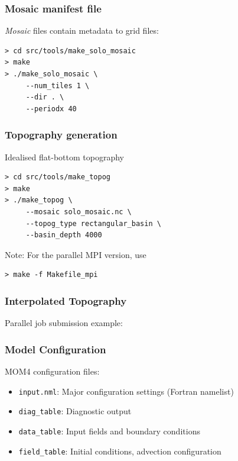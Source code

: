\documentclass[red]{beamer}
\begin{document}
\begin{frame}[fragile]
    \frametitle{Mosaic manifest file}
    
    \textit{Mosaic} files contain metadata to grid files:
    \begin{lstlisting}
> cd src/tools/make_solo_mosaic
> make
> ./make_solo_mosaic \
     --num_tiles 1 \
     --dir . \
     --periodx 40
    \end{lstlisting}
\end{frame}

\begin{frame}[fragile]
    \frametitle{Topography generation}
   
    Idealised flat-bottom topography
    \begin{lstlisting}
> cd src/tools/make_topog
> make
> ./make_topog \
     --mosaic solo_mosaic.nc \
     --topog_type rectangular_basin \
     --basin_depth 4000
    \end{lstlisting}

    Note: For the parallel MPI version, use
    \begin{lstlisting}
> make -f Makefile_mpi
    \end{lstlisting}
\end{frame}

\begin{frame}
    \frametitle{Interpolated Topography}
    
    Parallel job submission example:
    

\end{frame}

\begin{frame}
    \frametitle{Model Configuration}
    
    MOM4 configuration files:
    \begin{itemize}
        \item \lstinline|input.nml|: Major configuration settings (Fortran
            namelist)
        \item \lstinline|diag_table|: Diagnostic output
        \item \lstinline|data_table|: Input fields and boundary conditions
        \item \lstinline|field_table|: Initial conditions, advection
            configuration
    \end{itemize}
\end{frame}
\end{document}
